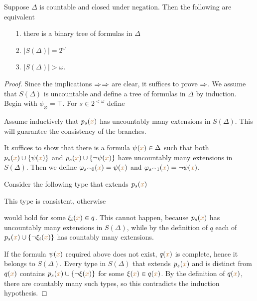 \begin{lemma}\label{lem_bin_tree}
Suppose $\Delta$ is countable and closed under negation.
Then the following are equivalent\nobreak
\begin{itemize}   
\item[1.] there is a binary tree of formulas in $\Delta$
\item[2.] $\big|S(\Delta)\big|=2^\omega$
\item[3.] $\big|S(\Delta)\big|>\omega$.
\end{itemize}
\end{lemma}
\begin{proof}
Since the implications $\Rightarrow$$\Rightarrow$ are clear, it
suffices to prove $\Rightarrow$.
We assume that $S(\Delta)$ is uncountable and define a tree of
formulas in $\Delta$ by induction.
Begin with $\phi_\varnothing=\top$.
For $s\in 2^{<\omega}$ define


Assume inductively that $p_s({\color{brown} x})$ has uncountably many extensions in $S(\Delta)$.
This will guarantee the consistency of the branches.

It suffices to show that there is a formula $\psi({\color{brown} x})\in\Delta$ such that
both $p_s({\color{brown} x})\cup\{\psi({\color{brown} x})\}$ and $p_s({\color{brown} x})\cup\{\neg\psi({\color{brown} x})\}$ have uncountably many
extensions in $S(\Delta)$.
Then we define $\varphi_{s^\frown0}({\color{brown} x})=\psi({\color{brown} x})$ and $\varphi_{s^\frown1}({\color{brown} x})=\neg\psi({\color{brown} x})$.

Consider the following type that extends $p_s({\color{brown} x})$


This type is consistent, otherwise 


would hold for some $\xi_i({\color{brown} x}) \in q$.
This cannot happen, because $p_s({\color{brown} x})$ has uncountably many extensions in
$S(\Delta)$, while by the definition of $q$ each of
$p_s({\color{brown} x})\cup\{\neg\xi_i({\color{brown} x})\}$ has countably many extensions.

If the formula $\psi({\color{brown} x})$ required above does not exist, $q({\color{brown} x})$ is complete,
hence it belongs to $S(\Delta)$.
Every type in $S(\Delta)$ that extends $p_s({\color{brown} x})$ and is distinct from $q({\color{brown} x})$
contains $p_s({\color{brown} x})\cup\{\neg\xi({\color{brown} x})\}$ for some $\xi({\color{brown} x})\in q({\color{brown} x})$.
By the definition of $q({\color{brown} x})$, there are countably many such types,
so this contradicts the induction hypothesis.
\end{proof}


